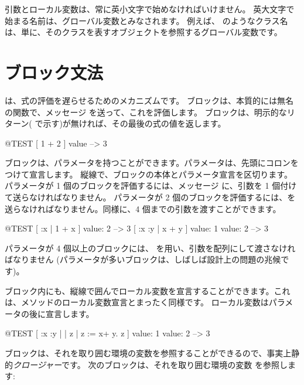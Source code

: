 \documentclass[a4paper,10pt,twoside]{book}
\begin{document}
引数とローカル変数は、常に英小文字で始めなければいけません。
英大文字で始まる名前は、グローバル変数とみなされます。
例えば、 のようなクラス名は、単に、そのクラスを表すオブジェクトを参照するグローバル変数です。

\section{ブロック文法}

は、式の評価を遅らせるためのメカニズムです。
ブロックは、本質的には無名の関数で、メッセージ  を送って、これを評価します。
ブロックは、明示的なリターン(\ct{^} で示す)が無ければ、その最後の式の値を返します。

\begin{code}{@TEST}
[ 1 + 2 ] value --> 3
\end{code}

ブロックは、パラメータを持つことができます。パラメータは、先頭にコロンをつけて宣言します。
縦線で、ブロックの本体とパラメータ宣言を区切ります。
パラメータが 1 個のブロックを評価するには、メッセージ  に、引数を 1 個付けて送らなければなりません。
パラメータが 2 個のブロックを評価するには、を送らなければなりません。同様に、4 個までの引数を渡すことができます。

\begin{code}{@TEST}
[ :x | 1 + x ] value: 2 --> 3
[ :x :y | x + y ] value: 1 value: 2 --> 3
\end{code}

パラメータが 4 個以上のブロックには、 を用い、引数を配列にして渡さなければなりません
(パラメータが多いブロックは、しばしば設計上の問題の兆候です)。

ブロック内にも、縦線で囲んでローカル変数を宣言することができます。これは、メソッドのローカル変数宣言とまったく同様です。
ローカル変数はパラメータの後に宣言します。

\begin{code}{@TEST}
[ :x :y | | z | z := x+ y. z ] value: 1 value: 2 --> 3
\end{code}

ブロックは、それを取り囲む環境の変数を参照することができるので、事実上静的\emph{クロージャー}です。
次のブロックは、それを取り囲む環境の変数  を参照します:
\end{document}
